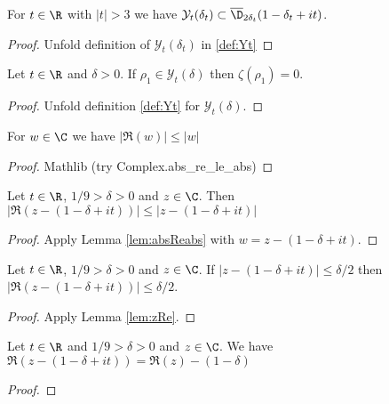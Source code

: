 \begin{lemma}[In disk] \label{lem:YinD}  \leanok
For $t\in \R$ with $|t|>3$ we have $\mathcal{Y}_t(\delta_t)\subset \overline{\D}_{2\delta_t}(1-\delta_t+it)$.
\end{lemma}
\begin{proof}
\leanok
Unfold definition of $\mathcal{Y}_t(\delta_t)$ in \cref{def:Yt}
\end{proof}

\begin{lemma}\label{lem:rhoYzero}  \leanok
Let $t\in\R$ and $\delta>0$. If $\rho_1\in \mathcal{Y}_t(\delta)$ then $\zeta(\rho_1) = 0$.
\end{lemma}
\begin{proof}
\leanok
{}
Unfold definition \ref{def:Yt} for $\mathcal{Y}_t(\delta)$.
\end{proof}


\begin{lemma}\label{lem:absReabs} 
\leanok
For $w\in\C$ we have $|\Re(w)| \le |w|$
\end{lemma}
\begin{proof}
\leanok
Mathlib (try Complex.abs\_re\_le\_abs)
\end{proof}

\begin{lemma}\label{lem:zRe} 
\leanok
Let $t\in\R$, $1/9 > \delta >0$ and $z\in \C$. Then $|\Re(z-(1-\delta+it))| \le |z-(1-\delta+it)|$
\end{lemma}
\begin{proof}
\leanok
{}
Apply Lemma \ref{lem:absReabs} with $w=z-(1-\delta+it)$.
\end{proof}

\begin{lemma}\label{lem:zRe2} 
\leanok
Let $t\in\R$, $1/9 > \delta >0$ and $z\in \C$. If $|z-(1-\delta+it)| \le \delta/2$ then $|\Re(z-(1-\delta+it))| \le \delta/2$.
\end{lemma}
\begin{proof}
\leanok
{}
Apply Lemma \ref{lem:zRe}.
\end{proof}


\begin{lemma}\label{lem:Rezit} 
\leanok
Let $t\in\R$ and $1/9 > \delta >0$ and $z\in \C$. We have $\Re(z-(1-\delta+it)) = \Re(z)-(1-\delta)$
\end{lemma}
\begin{proof}
\leanok
\end{proof}

